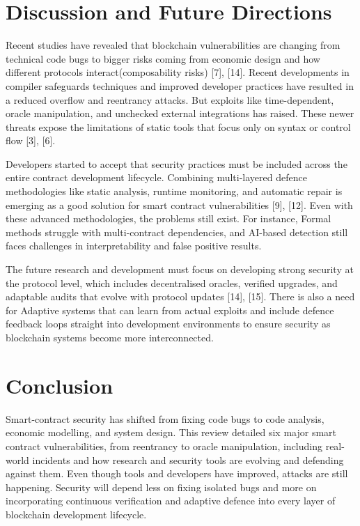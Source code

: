 \documentclass[conference]{IEEEtran}
\begin{document}
\section{Discussion and Future Directions}
Recent studies have revealed that blockchain vulnerabilities are changing from technical code bugs to bigger risks coming from economic design and how different protocols interact(composability risks) [7], [14]. Recent developments in compiler safeguards techniques and improved developer practices have resulted in a reduced overflow and reentrancy attacks. But exploits like time-dependent, oracle manipulation, and unchecked external integrations has raised. These newer threats expose the limitations of static tools that focus only on syntax or control flow [3], [6].  

Developers started to accept that security practices must be included across the entire contract development lifecycle. Combining multi-layered defence methodologies like static analysis, runtime monitoring, and automatic repair is emerging as a good solution for smart contract vulnerabilities [9], [12]. Even with these advanced methodologies, the problems still exist. For instance, Formal methods struggle with multi-contract dependencies, and AI-based detection still faces challenges in interpretability and false positive results.  

The future research and development must focus on developing strong security at the protocol level, which includes decentralised oracles, verified upgrades, and adaptable audits that evolve with protocol updates [14], [15]. There is also a need for Adaptive systems that can learn from actual exploits and include defence feedback loops straight into development environments to ensure security as blockchain systems become more interconnected.  

\section{Conclusion}
Smart-contract security has shifted from fixing code bugs to code analysis, economic modelling, and system design. This review detailed six major smart contract vulnerabilities, from reentrancy to oracle manipulation, including real-world incidents and how research and security tools are evolving and defending against them. Even though tools and developers have improved, attacks are still happening. Security will depend less on fixing isolated bugs and more on incorporating continuous verification and adaptive defence into every layer of blockchain development lifecycle.
\end{document}
